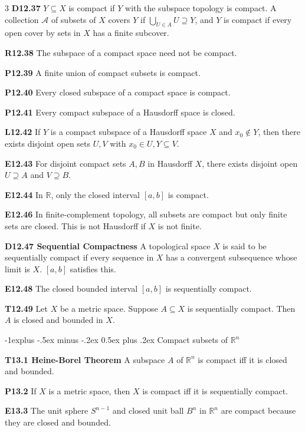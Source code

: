 \documentclass[10pt, landscape]{article}
\makeatletter
\renewcommand{\section}{\@startsection{section}{1}{0mm}%
                                {-1ex plus -.5ex minus -.2ex}%
                                {0.5ex plus .2ex}%
                                {\normalfont\large\bfseries}}
\renewcommand{\section}{\@startsection{section}{2}{0mm}%
                                {-1explus -.5ex minus -.2ex}%
                                {0.5ex plus .2ex}%
                                {\normalfont\normalsize\bfseries}}
\makeatother
\begin{document}
\begin{multicols*}{3}
\textbf{D12.37} $Y \subseteq X$ is compact if $Y$ with the subspace topology is compact. A collection $\mathcal{A}$ of subsets of $X$ covers $Y$ if $\bigcup_{U \in A}U \supseteq Y$, and $Y$ is compact if every open cover by sets in $X$ has a finite subcover.

\textbf{R12.38} The subspace of a compact space need not be compact.

\textbf{P12.39} A finite union of compact subsets is compact.

\textbf{P12.40} Every closed subspace of a compact space is compact.

\textbf{P12.41} Every compact subspace of a Hausdorff space is closed.

\textbf{L12.42} If $Y$ is a compact subspace of a Hausdorff space $X$ and $x_0 \notin Y$, then there exists disjoint open sets $U, V$ with $x_0 \in U, Y \subseteq V$.

\textbf{E12.43} For disjoint compact sets $A, B$ in Hausdorff $X$, there exists disjoint open $U \supseteq A$ and $V \supseteq B$.

\textbf{E12.44} In $\mathbb{R}$, only the closed interval $[a,b]$ is compact.

\textbf{E12.46} In finite-complement topology, all subsets are compact but only finite sets are closed. This is not Hausdorff if $X$ is not finite.

\textbf{D12.47 Sequential Compactness} A topological space $X$ is said to be sequentially compact if every sequence in $X$ has a convergent subsequence whose limit is $X$. $[a,b]$ satisfies this.

\textbf{E12.48} The closed bounded interval $[a,b]$ is sequentially compact.

\textbf{T12.49} Let $X$ be a metric space. Suppose $A \subseteq X$ is sequentially compact. Then $A$ is closed and bounded in $X$.

\section{Compact subsets of $\mathbb{R}^n$}

\textbf{T13.1 Heine-Borel Theorem} A subspace $A$ of $\mathbb{R}^n$ is compact iff it is closed and bounded.

\textbf{P13.2} If $X$ is a metric space, then $X$ is compact iff it is sequentially compact.

\textbf{E13.3} The unit sphere $S^{n-1}$ and closed unit ball $B^n$ in $\mathbb{R}^n$ are compact because they are closed and bounded.


\end{multicols*}
\end{document}
